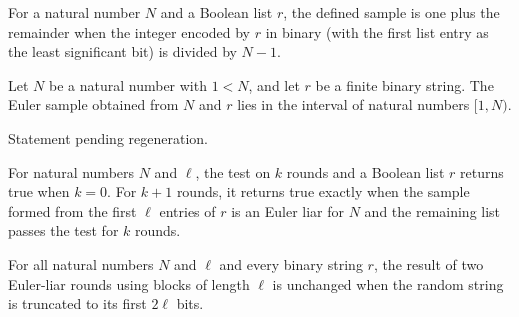 \begin{definition}
\label{Randomized.eulerSample}
\leanok
{}
For a natural number $N$ and a Boolean list $r$, the defined sample is one plus the
remainder when the integer encoded by $r$ in binary (with the first list entry as the
least significant bit) is divided by $N-1$.
\end{definition}

\begin{theorem}
\label{Randomized.eulerSample_mem_Ico}
\leanok
{}
Let $N$ be a natural number with $1<N$, and let $r$ be a finite binary string. The Euler
sample obtained from $N$ and $r$ lies in the interval of natural numbers $[1,N)$.
\end{theorem}

\begin{theorem}
\label{Randomized.randProb_isEulerLiar_le}
\leanok
{}
Statement pending regeneration.
\end{theorem}

\begin{definition}
\label{Randomized.eulerLiarRounds}
\leanok
{}
For natural numbers $N$ and $\ell$, the test on $k$ rounds and a Boolean list $r$
returns true when $k=0$. For $k+1$ rounds, it returns true exactly when the sample
formed from the first $\ell$ entries of $r$ is an Euler liar for $N$ and the remaining
list passes the test for $k$ rounds.
\end{definition}

\begin{theorem}
\label{Randomized.eulerLiarRounds_two_take}
\leanok
{}
For all natural numbers $N$ and $\ell$ and every binary string $r$, the result of two
Euler-liar rounds using blocks of length $\ell$ is unchanged when the random string is
truncated to its first $2\ell$ bits.
\end{theorem}

